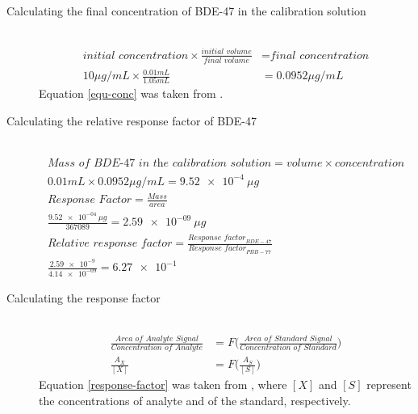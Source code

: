 \documentclass[a4paper, 12pt]{article}
\begin{document}
\begin{description}

	\item[Calculating the final concentration of BDE-47 in the calibration solution] \hfill \\
		\begin{equation} \label{equ-conc}
			\begin{split}
				\textit{initial concentration} \times \frac{\textit{initial volume}}{\textit{final volume}} & = \textit{final concentration} \\
				10 \si{\mu{}g/mL} \times \frac{0.01\si{mL}}{1.05\si{mL}} & = 0.0952 \si{\mu{}g/mL}
			\end{split}
		\end{equation}
		Equation \ref{equ-conc} was taken from \cite{harris}.

	\item[Calculating the relative response factor of BDE-47] \hfill \\
		\begin{gather*} \label{equ-rrf}
				\textit{Mass of BDE-47 in the calibration solution} = \textit{volume} \times \textit{concentration} \\
				0.01\si{mL} \times 0.0952 \si{\mu{}g/mL} = \SI{9.52e-4}{\mu{}g} \\
				\textit{Response Factor} = \frac{\textit{Mass}}{\textit{area}} \\
				\frac{\SI{9.52e-04}{\mu{}g}}{367089} = \SI{2.59e-09}{\mu{}g} \\
				\textit{Relative response factor} = \frac{\textit{Response factor}_{BDE-47}}{\textit{Response factor}_{PBB-77}} \\
				\frac{\num{2.59e-9}}{\num{4.14e-09}} = \num{6.27e-1}
		\end{gather*}

	\item[Calculating the response factor] \hfill \\
		\begin{equation} \label{response-factor}
			\begin{split}
				\frac{\textit{Area of Analyte Signal}}{\textit{Concentration of Analyte}} & = F\Bigg(\frac{\textit{Area of Standard Signal}}{\textit{Concentration of Standard}}\Bigg) \\
				\frac{A_X}{[X]} & = F\Bigg(\frac{A_S}{[S]}\Bigg)
			\end{split}
		\end{equation}
		Equation \ref{response-factor} was taken from \cite{harris}, where $[X]$ and $[S]$ represent the concentrations of analyte and of the standard, respectively.


\end{description}
\end{document}
